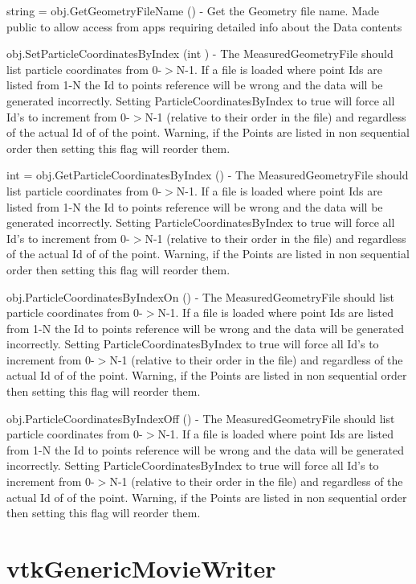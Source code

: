 \begin{DoxyItemize}
\item {\ttfamily string = obj.\-Get\-Geometry\-File\-Name ()} -\/ Get the Geometry file name. Made public to allow access from apps requiring detailed info about the Data contents  
\item {\ttfamily obj.\-Set\-Particle\-Coordinates\-By\-Index (int )} -\/ The Measured\-Geometry\-File should list particle coordinates from 0-\/$>$N-\/1. If a file is loaded where point Ids are listed from 1-\/\-N the Id to points reference will be wrong and the data will be generated incorrectly. Setting Particle\-Coordinates\-By\-Index to true will force all Id's to increment from 0-\/$>$N-\/1 (relative to their order in the file) and regardless of the actual Id of of the point. Warning, if the Points are listed in non sequential order then setting this flag will reorder them.  
\item {\ttfamily int = obj.\-Get\-Particle\-Coordinates\-By\-Index ()} -\/ The Measured\-Geometry\-File should list particle coordinates from 0-\/$>$N-\/1. If a file is loaded where point Ids are listed from 1-\/\-N the Id to points reference will be wrong and the data will be generated incorrectly. Setting Particle\-Coordinates\-By\-Index to true will force all Id's to increment from 0-\/$>$N-\/1 (relative to their order in the file) and regardless of the actual Id of of the point. Warning, if the Points are listed in non sequential order then setting this flag will reorder them.  
\item {\ttfamily obj.\-Particle\-Coordinates\-By\-Index\-On ()} -\/ The Measured\-Geometry\-File should list particle coordinates from 0-\/$>$N-\/1. If a file is loaded where point Ids are listed from 1-\/\-N the Id to points reference will be wrong and the data will be generated incorrectly. Setting Particle\-Coordinates\-By\-Index to true will force all Id's to increment from 0-\/$>$N-\/1 (relative to their order in the file) and regardless of the actual Id of of the point. Warning, if the Points are listed in non sequential order then setting this flag will reorder them.  
\item {\ttfamily obj.\-Particle\-Coordinates\-By\-Index\-Off ()} -\/ The Measured\-Geometry\-File should list particle coordinates from 0-\/$>$N-\/1. If a file is loaded where point Ids are listed from 1-\/\-N the Id to points reference will be wrong and the data will be generated incorrectly. Setting Particle\-Coordinates\-By\-Index to true will force all Id's to increment from 0-\/$>$N-\/1 (relative to their order in the file) and regardless of the actual Id of of the point. Warning, if the Points are listed in non sequential order then setting this flag will reorder them.  
\end{DoxyItemize}\hypertarget{vtkio_vtkgenericmoviewriter}{}\section{vtk\-Generic\-Movie\-Writer}\label{vtkio_vtkgenericmoviewriter}
